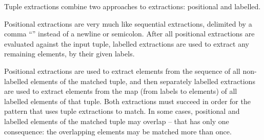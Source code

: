 Tuple extractions combine two approaches to extractions: positional and labelled. 

Positional extractions are very much like sequential extractions, delimited by a comma ``\code{,}'' instead of a newline or semicolon. After all positional extractions are evaluated against the input tuple, labelled extractions are used to extract any remaining elements, by their given labels. 

Positional extractions are used to extract elements from the sequence of all non-labelled elements of the matched tuple, and then separately labelled extractions are used to extract elements from the map (from labels to elements) of all labelled elements of that tuple. Both extractions must succeed in order for the pattern that uses tuple extractions to match. In some cases, positional and labelled elements of the matched tuple may overlap -- that has only one consequence: the overlapping elements may be matched more than once. 

